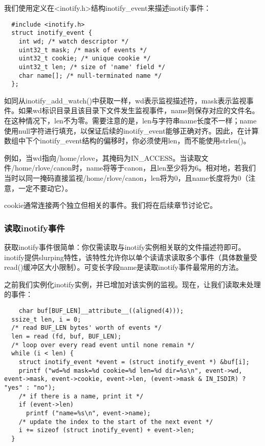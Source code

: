我们使用定义在<inotify.h>结构inotify\_event来描述inotify事件：

\begin{lstlisting}
  #include <inotify.h>
  struct inotify_event {
    int wd; /* watch descriptor */
    uint32_t mask; /* mask of events */
    uint32_t cookie; /* unique cookie */
    uint32_t len; /* size of 'name' field */
    char name[]; /* null-terminated name */
  };
\end{lstlisting}

如同从inotify\_add\_watch()中获取一样，wd表示监视描述符，mask表示监视事件。如果wd标识目录且该目录下文件发生监视事件，name则保存对应的文件名。在这种情况下，len不为零。需要注意的是，len与字符串name长度不一样；name使用null字符进行填充，以保证后续的inotify\_event能够正确对齐。因此，在计算数组中下个inotify\_event结构的偏移时，你必须使用len，而不能使用strlen()。

例如，当wd指向/home/rlove，其掩码为IN\_ACCESS。当读取文件/home/rlove/canon时，name将等于canon，且len至少将为6。相对地，若我们当时以同一掩码直接监视/home/rlove/canon，len将为0，且name长度将为0（注意，一定不要动它）。

cookie通常连接两个独立但相关的事件。我们将在后续章节讨论它。

\subsubsection{读取inotify事件}

获取inotify事件很简单：你仅需读取与inotify实例相关联的文件描述符即可。inotify提供slurping特性，该特性允许你以单个读请求读取多个事件（具体数量受read()缓冲区大小限制）。可变长字段name是读取inotify事件最常用的方法。

之前我们实例化inotify实例，并已增加对该实例的监视。现在，让我们读取未处理的事件：

\begin{lstlisting}
	char buf[BUF_LEN]__attribute__((aligned(4)));
  ssize_t len, i = 0;
  /* read BUF_LEN bytes' worth of events */
  len = read (fd, buf, BUF_LEN);
  /* loop over every read event until none remain */
  while (i < len) {
    struct inotify_event *event = (struct inotify_event *) &buf[i];
    printf ("wd=%d mask=%d cookie=%d len=%d dir=%s\n", event->wd, event->mask, event->cookie, event->len, (event->mask & IN_ISDIR) ? "yes" : "no");
    /* if there is a name, print it */
    if (event->len)
      printf ("name=%s\n", event->name);
    /* update the index to the start of the next event */
    i += sizeof (struct inotify_event) + event->len;
  }
\end{lstlisting}

